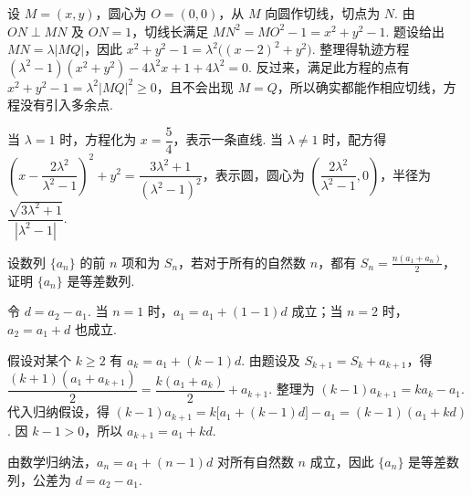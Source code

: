 \documentclass[UTF8,a4paper,oneside,11pt]{ctexbook}
\begin{document}
\begin{solution}
设 \(M=(x,y)\)，圆心为 \(O=(0,0)\)，从 \(M\) 向圆作切线，切点为 \(N\). 由 \(ON\perp MN\) 及 \(ON=1\)，切线长满足 \(MN^2=MO^2-1=x^2+y^2-1\). 题设给出 \(MN=\lambda|MQ|\)，因此
\(x^2+y^2-1=\lambda^2\bigl((x-2)^2+y^2\bigr)\). 整理得轨迹方程
\((\lambda^2-1)(x^2+y^2)-4\lambda^2x+1+4\lambda^2=0\). 反过来，满足此方程的点有 \(x^2+y^2-1=\lambda^2|MQ|^2\geqslant0\)，且不会出现 \(M=Q\)，所以确实都能作相应切线，方程没有引入多余点.

当 \(\lambda=1\) 时，方程化为 \(x=\dfrac54\)，表示一条直线. 当 \(\lambda\neq1\) 时，配方得
\(\left(x-\dfrac{2\lambda^2}{\lambda^2-1}\right)^2+y^2=\dfrac{3\lambda^2+1}{(\lambda^2-1)^2}\)，表示圆，圆心为 \(\left(\dfrac{2\lambda^2}{\lambda^2-1},0\right)\)，半径为 \(\dfrac{\sqrt{3\lambda^2+1}}{|\lambda^2-1|}\).
\end{solution}

\begin{problem}
设数列 \(\{a_n\}\) 的前 \(n\) 项和为 \(S_n\)，若对于所有的自然数 \(n\)，都有 \(S_n = \frac{n(a_1 + a_n)}{2}\)，证明 \(\{a_n\}\) 是等差数列.
\end{problem}

\begin{solution}
令 \(d=a_2-a_1\). 当 \(n=1\) 时，\(a_1=a_1+(1-1)d\) 成立；当 \(n=2\) 时，\(a_2=a_1+d\) 也成立.

假设对某个 \(k\geqslant2\) 有 \(a_k=a_1+(k-1)d\). 由题设及 \(S_{k+1}=S_k+a_{k+1}\)，得
\(\dfrac{(k+1)(a_1+a_{k+1})}{2}=\dfrac{k(a_1+a_k)}{2}+a_{k+1}\). 整理为 \((k-1)a_{k+1}=ka_k-a_1\). 代入归纳假设，得
\((k-1)a_{k+1}=k\bigl[a_1+(k-1)d\bigr]-a_1=(k-1)(a_1+kd)\). 因 \(k-1>0\)，所以 \(a_{k+1}=a_1+kd\).

由数学归纳法，\(a_n=a_1+(n-1)d\) 对所有自然数 \(n\) 成立，因此 \(\{a_n\}\) 是等差数列，公差为 \(d=a_2-a_1\).
\end{solution}

\end{document}
